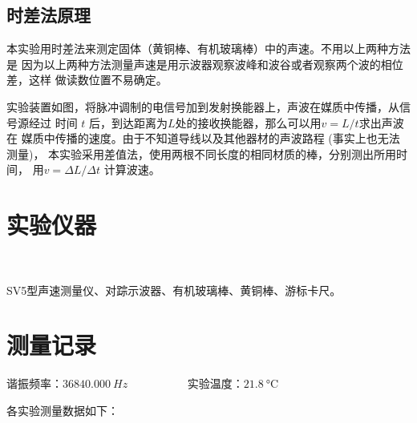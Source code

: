 \documentclass{article}
\begin{document}
\subsection*{时差法原理}
本实验用时差法来测定固体（黄铜棒、有机玻璃棒）中的声速。不用以上两种方法是
因为以上两种方法测量声速是用示波器观察波峰和波谷或者观察两个波的相位差，这样
做读数位置不易确定。

实验装置如图，将脉冲调制的电信号加到发射换能器上，声波在媒质中传播，从信号源经过
时间 $t$ 后，到达距离为$L$处的接收换能器，那么可以用$v=L / t$求出声波在
媒质中传播的速度。由于不知道导线以及其他器材的声波路程 (事实上也无法测量)，
本实验采用差值法，使用两根不同长度的相同材质的棒，分别测出所用时间，
用$v=\Delta L / \Delta t$ 计算波速。
\newpage

\section*{实验仪器}
\

SV5型声速测量仪、对踪示波器、有机玻璃棒、黄铜棒、游标卡尺。
\section*{测量记录}
谐振频率：$\SI{36840.000}{Hz}$ \ \ \ \ \ \ \ \ \ \   实验温度：$\SI{21.8}{\degreeCelsius}$

各实验测量数据如下：
\end{document}
